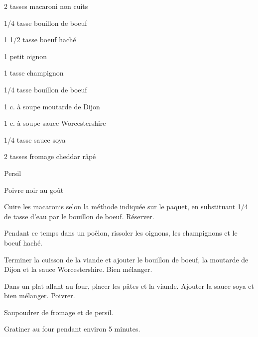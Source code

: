 


\totaltime{}


\begin{ingredients}
    \item[] 
    \item 2 tasses macaroni non cuits
    \item 1/4 tasse bouillon de boeuf
    \item 1 1/2 tasse boeuf haché
    \item 1 petit oignon
    \item 1 tasse champignon
    \item[] 
    \item 1/4 tasse bouillon de boeuf
    \item 1 c. à soupe moutarde de Dijon
    \item 1 c. à soupe sauce Worcestershire
    \item 1/4 tasse sauce soya
    \item 2 tasses fromage cheddar râpé
    \item Persil
    \item Poivre noir au goût
\end{ingredients}

\begin{steps}
    \item Cuire les macaronis selon la méthode indiquée sur le paquet, en substituant 1/4 de tasse d'eau par le bouillon de boeuf. Réserver.
    \item Pendant ce temps dans un poêlon, rissoler les oignons, les champignons et le boeuf haché.
    \item Terminer la cuisson de la viande et ajouter le bouillon de boeuf, la moutarde de Dijon et la sauce Worcestershire. Bien mélanger.
    \item Dans un plat allant au four, placer les pâtes et la viande. Ajouter la sauce soya et bien mélanger. Poivrer.
    \item Saupoudrer de fromage et de persil.
    \item Gratiner au four pendant environ 5 minutes.
\end{steps}
